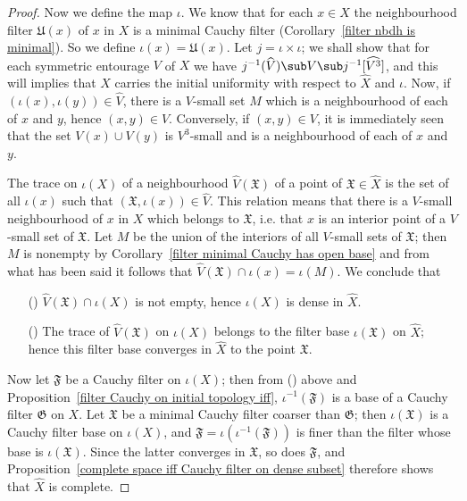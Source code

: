 \begin{proof}
Now we define the map $\iota$. We know that for each $x\in X$ the neighbourhood filter $\mathfrak{U}(x)$ of $x$ in $X$ is a minimal Cauchy filter (Corollary~\ref{filter nbdh is minimal}). So we define $\iota(x)=\mathfrak{U}(x)$. Let $j=\iota\times\iota$; we shall show that for each symmetric entourage $V$ of $X$ we have $j^{-1}(\widehat{V})\sub V\sub j^{-1}[\widehat{V^3}]$, and this will implies that $X$ carries the initial uniformity with respect to $\widehat{X}$ and $\iota$. Now, if $(\iota(x),\iota(y))\in\widehat{V}$, there is a $V$-small set $M$ which is a neighbourhood of each of $x$ and $y$, hence $(x,y)\in V$. Conversely, if $(x,y)\in V$, it is immediately seen that the set $V(x)\cup V(y)$ is $V^3$-small and is a neighbourhood of each of $x$ and $y$.\par
The trace on $\iota(X)$ of a neighbourhood $\widehat{V}(\mathfrak{X})$ of a point of $\mathfrak{X}\in\widehat{X}$ is the set of all $\iota(x)$ such that $(\mathfrak{X},\iota(x))\in\widehat{V}$. This relation means that there is a $V$-small neighbourhood of $x$ in $X$ which belongs to $\mathfrak{X}$, i.e. that $x$ is an interior point of a $V$-small set of $\mathfrak{X}$. Let $M$ be the union of the interiors of all $V$-small sets of $\mathfrak{X}$; then $M$ is nonempty by Corollary~\ref{filter minimal Cauchy has open base} and from what has been said it follows that $\widehat{V}(\mathfrak{X})\cap\iota(x)=\iota(M)$. We conclude that 
\begin{itemize}
\item[(\rmnum{1})] $\widehat{V}(\mathfrak{X})\cap\iota(X)$ is not empty, hence $\iota(X)$ is dense in $\widehat{X}$.
\item[(\rmnum{2})] The trace of $\widehat{V}(\mathfrak{X})$ on $\iota(X)$ belongs to the filter base $\iota(\mathfrak{X})$ on $\widehat{X}$; hence this filter base converges in $\widehat{X}$ to the point $\mathfrak{X}$.
\end{itemize}
Now let $\mathfrak{F}$ be a Cauchy filter on $\iota(X)$; then from () above and Proposition~\ref{filter Cauchy on initial topology iff}, $\iota^{-1}(\mathfrak{F})$ is a base of a Cauchy filter $\mathfrak{G}$ on $X$. Let $\mathfrak{X}$ be a minimal Cauchy filter coarser than $\mathfrak{G}$; then $\iota(\mathfrak{X})$ is a Cauchy filter base on $\iota(X)$, and $\mathfrak{F}=\iota(\iota^{-1}(\mathfrak{F}))$ is finer than the filter whose base is $\iota(\mathfrak{X})$. Since the latter converges in $\mathfrak{X}$, so does $\mathfrak{F}$, and Proposition~\ref{complete space iff Cauchy filter on dense subset} therefore shows that $\widehat{X}$ is complete.\par

\end{proof}
